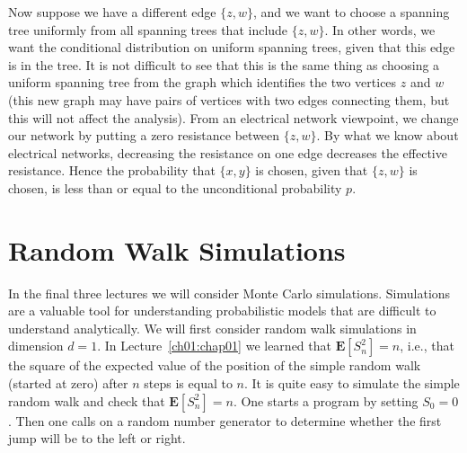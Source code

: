 \documentclass{stml-l}
\theoremstyle{definition}
\numberwithin{equation}{chapter}
\numberwithin{figure}{chapter}
\numberwithin{figure}{section}
\begin{document}
Now suppose we have a different edge $\{z,w\}$, and we want to
choose a spanning tree uniformly from all spanning trees that
include $\{z,w\}$. In other words, we want the conditional
distribution on uniform spanning trees, given that this edge is in
the tree. It is not difficult to see that this is the same thing as
choosing a uniform spanning tree from the graph which identifies the
two vertices $z$ and $w$ (this new graph may have pairs of vertices
with two edges connecting them, but this will not affect the
analysis). From an electrical network viewpoint, we change our
network by putting a zero resistance between $\{z,w\}$. By what we
know about electrical networks, decreasing the resistance on one
edge decreases the effective resistance. Hence the probability that
$\{x,y\}$ is chosen, given that $\{z,w\}$ is chosen, is less than or
equal to the unconditional probability $p$.

\chapter{Random Walk Simulations\label{ch11:chap11}}

In the final three lectures we will consider Monte Carlo
simulations. Simulations are a valuable tool for understanding
probabilistic models that are difficult to understand analytically.
We will first consider random walk simulations in dimension $d=1$.
In Lecture~\ref{ch01:chap01} we learned that
$\mathbf{E}[S_{n}^{2}]=n$, i.e., that the square of the expected
value of the position of the simple random walk (started at zero)
after $n$ steps is equal to $n$. It is quite easy to simulate the
simple random walk and check that $\mathbf{E}[S_{n}^{2}]=n$. One
starts a program by setting $S_{0}=0$. Then one calls on a random
number generator to determine whether the first jump will be to the
left or right.
\end{document}
